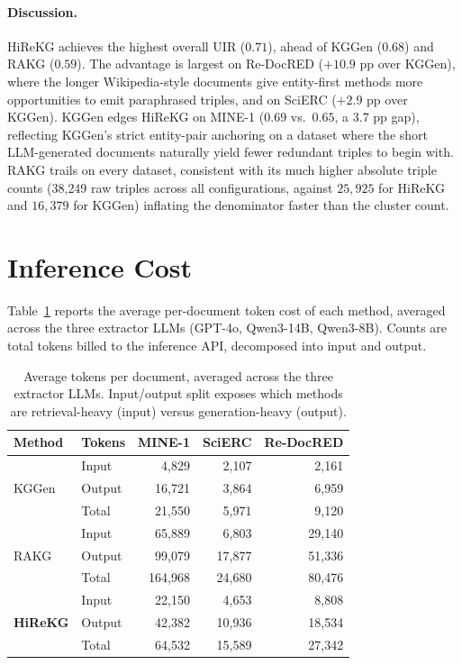 \documentclass[11pt]{article}
\begin{document}
\paragraph{Discussion.} HiReKG achieves the highest overall UIR ($0.71$), ahead of KGGen ($0.68$) and RAKG ($0.59$). The advantage is largest on Re-DocRED ($+10.9$ pp over KGGen), where the longer Wikipedia-style documents give entity-first methods more opportunities to emit paraphrased triples, and on SciERC ($+2.9$ pp over KGGen). KGGen edges HiReKG on MINE-1 ($0.69$ vs.\ $0.65$, a $3.7$ pp gap), reflecting KGGen's strict entity-pair anchoring on a dataset where the short LLM-generated documents naturally yield fewer redundant triples to begin with. RAKG trails on every dataset, consistent with its much higher absolute triple counts (38{,}249 raw triples across all configurations, against $25{,}925$ for HiReKG and $16{,}379$ for KGGen) inflating the denominator faster than the cluster count.


\section{Inference Cost}
\label{app:cost}

Table~\ref{tab:cost} reports the average per-document token cost of each method, averaged across the three extractor LLMs (GPT-4o, Qwen3-14B, Qwen3-8B). Counts are total tokens billed to the inference API, decomposed into input and output.

\begin{table}[h]
\centering
\small
\setlength{\tabcolsep}{4pt}
\renewcommand{\arraystretch}{1.1}
\begin{tabular}{ll|rrr}
\toprule
\textbf{Method} & \textbf{Tokens} & \textbf{MINE-1} & \textbf{SciERC} & \textbf{Re-DocRED} \\
\midrule
\multirow{3}{*}{KGGen}
  & Input  &   4{,}829 &   2{,}107 &   2{,}161 \\
  & Output &  16{,}721 &   3{,}864 &   6{,}959 \\
  & Total  &  21{,}550 &   5{,}971 &   9{,}120 \\
\midrule
\multirow{3}{*}{RAKG}
  & Input  &  65{,}889 &   6{,}803 &  29{,}140 \\
  & Output &  99{,}079 &  17{,}877 &  51{,}336 \\
  & Total  & 164{,}968 &  24{,}680 &  80{,}476 \\
\midrule
\multirow{3}{*}{\textbf{HiReKG}}
  & Input  &  22{,}150 &   4{,}653 &   8{,}808 \\
  & Output &  42{,}382 &  10{,}936 &  18{,}534 \\
  & Total  &  64{,}532 &  15{,}589 &  27{,}342 \\
\bottomrule
\end{tabular}
\caption{Average tokens per document, averaged across the three extractor LLMs. Input/output split exposes which methods are retrieval-heavy (input) versus generation-heavy (output).}
\label{tab:cost}
\end{table}
\end{document}
